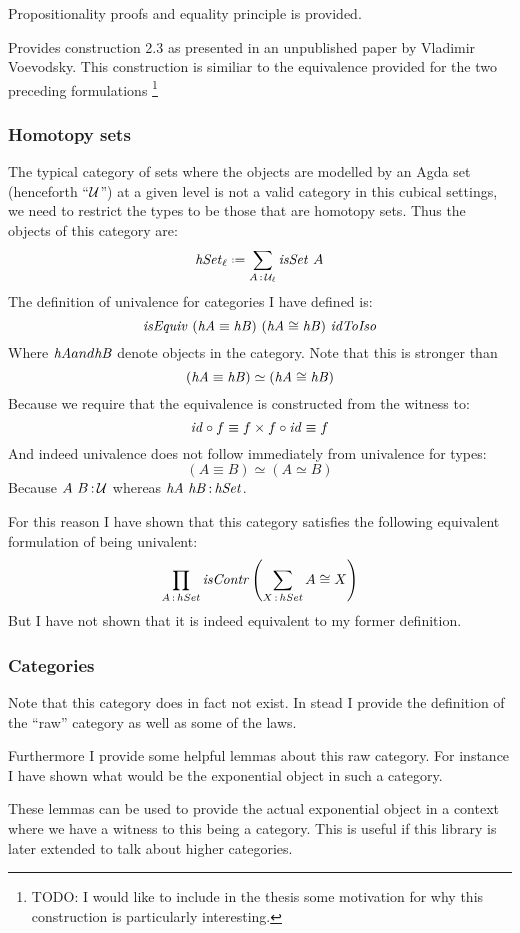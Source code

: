 Propositionality proofs and equality principle is provided.


Provides construction 2.3 as presented in an unpublished paper by Vladimir
Voevodsky. This construction is similiar to the equivalence provided for the two
preceding formulations
\footnote{ TODO: I would like to include in the thesis some motivation for why
  this construction is particularly interesting.}

\subsubsection{Homotopy sets}
The typical category of sets where the objects are modelled by an Agda set
(henceforth ``$\mathcal{U}$'') at a given level is not a valid category in this cubical
settings, we need to restrict the types to be those that are homotopy sets. Thus
the objects of this category are:
%
$$\hSet_\ell \defeq \sum_{A \tp \MCU_\ell} \isSet\ A$$
%
The definition of univalence for categories I have defined is:
%
$$\isEquiv\ (\hA \equiv \hB)\ (\hA \cong \hB)\ \idToIso$$
%
Where $\mathit{hA} and \mathit{hB}$ denote objects in the category. Note that this is stronger
than
%
$$(\mathit{hA} \equiv \mathit{hB}) \simeq (\mathit{hA} \cong \mathit{hB})$$
%
Because we require that the equivalence is constructed from the witness to:
%
$$\mathit{id} \circ f \equiv f \times f \circ \mathit{id} \equiv f$$
%
And indeed univalence does not follow immediately from univalence for types:
%
$$(A \equiv B) \simeq (A \simeq B)$$
%
Because $A\ B \,\mathord{:}\, \mathcal{U}$ whereas $\mathit{hA}\ \mathit{hB} \,\mathord{:}\, \mathit{hSet}$.

For this reason I have shown that this category satisfies the following
equivalent formulation of being univalent:
%
$$\prod_{A \,\mathord{:}\, hSet} \mathit{isContr} \left( \sum_{X \,\mathord{:}\, hSet} A \cong X \right)$$
%
But I have not shown that it is indeed equivalent to my former definition.
\subsubsection{Categories}
Note that this category does in fact not exist. In stead I provide the
definition of the ``raw'' category as well as some of the laws.

Furthermore I provide some helpful lemmas about this raw category. For instance
I have shown what would be the exponential object in such a category.

These lemmas can be used to provide the actual exponential object in a context
where we have a witness to this being a category. This is useful if this library
is later extended to talk about higher categories.

